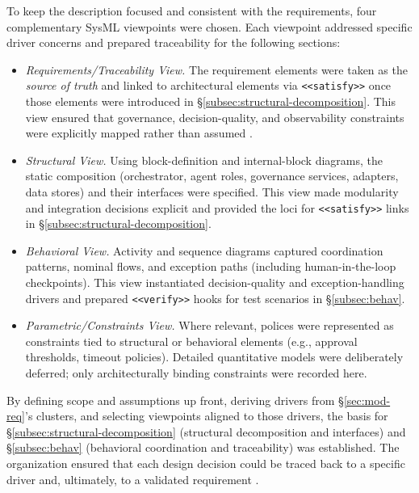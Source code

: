 To keep the description focused and consistent with the requirements, four complementary SysML viewpoints were chosen. Each viewpoint addressed specific driver concerns and prepared traceability for the following sections:
\begin{itemize}
\item \emph{Requirements/Traceability View.} The requirement elements were taken as the \emph{source of truth} and linked to architectural elements via \texttt{<<satisfy>>} once those elements were introduced in §\ref{subsec:structural-decomposition}. This view ensured that governance, decision-quality, and observability constraints were explicitly mapped rather than assumed \parencite{IEEEStandard1990}.
\item \emph{Structural View.} Using block-definition and internal-block diagrams, the static composition (orchestrator, agent roles, governance services, adapters, data stores) and their interfaces were specified. This view made modularity and integration decisions explicit and provided the loci for \texttt{<<satisfy>>} links in §\ref{subsec:structural-decomposition}.
\item \emph{Behavioral View.} Activity and sequence diagrams captured coordination patterns, nominal flows, and exception paths (including human-in-the-loop checkpoints). This view instantiated decision-quality and exception-handling drivers and prepared \texttt{<<verify>>} hooks for test scenarios in §\ref{subsec:behav}.
\item \emph{Parametric/Constraints View.} Where relevant, polices were represented as constraints tied to structural or behavioral elements (e.g., approval thresholds, timeout policies). Detailed quantitative models were deliberately deferred; only architecturally binding constraints were recorded here.
\end{itemize}

By defining scope and assumptions up front, deriving drivers from §\ref{sec:mod-req}'s clusters, and selecting viewpoints aligned to those drivers, the basis for §\ref{subsec:structural-decomposition} (structural decomposition and interfaces) and §\ref{subsec:behav} (behavioral coordination and traceability) was established. The organization ensured that each design decision could be traced back to a specific driver and, ultimately, to a validated requirement \parencite{IEEEStandard1990,peffersDesign2007}.

